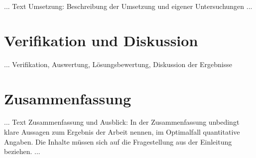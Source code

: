 ... Text Umsetzung: Beschreibung der Umsetzung und eigener Untersuchungen ...



\chapter{Verifikation und Diskussion}
\label{cha:Verifikation}

... Verifikation, Auswertung, Lösungsbewertung, Diskussion der Ergebnisse

\chapter{Zusammenfassung}
\label{cha:zusammenfassung}

... Text Zusammenfassung und Ausblick: In der Zusammenfassung unbedingt klare Aussagen zum Ergebnis der Arbeit nennen, im Optimalfall quantitative Angaben. Die Inhalte müssen sich auf die Fragestellung aus der Einleitung  beziehen. ...
